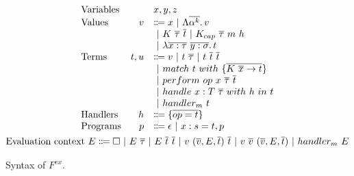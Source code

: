 \documentclass[acmsmall]{acmart}
\newcommand{\vor}{~|~}
\newcommand{\ap}{~}
\begin{document}
\begin{figure}
    \centering
    \begin{gather*}
        \begin{array}{lrll}
            \text{Variables} & & x, y, z \\
            \text{Values} &v &\Coloneqq x \vor \Lambda \overline{\alpha^k} \ldotp v \\
            &&\vor K\ap \overline{\tau} \ap \overline{t} \vor K_{cap}\ap\overline{\tau}\ap m\ap h \\
            &&\vor \lambda \overline{x : \tau}~\overline{y : \sigma}\ldotp t
            \\
            \text{Terms} &t, u &\Coloneqq v \vor t\ap\overline{\tau} \vor t \ap \overline{t} \ap \overline{t} \\
            &&\vor match ~ t ~ with ~\{\overline{K \ap \overline{x} \to t}\} \\
            &&\vor perform ~ op \ap x \ap \overline{\tau} \ap \overline{t} \\
            &&\vor handle ~ x : T \ap \overline{\tau} ~with ~h~in ~t \\
            &&\vor handler_m ~ t
            \\
            \text{Handlers} &h &\Coloneqq \{ \overline{op = t} \}
            \\
            \text{Programs} &p &\Coloneqq \epsilon \vor x : s = t, p
        \end{array}\\
        \begin{aligned}
            \text{Evaluation context } E \Coloneqq \square \vor E \ap \overline{\tau} \vor E \ap \overline{t}\ap \overline{t} \vor v \ap (\overline{v}, E, \overline{t}) \ap \overline{t} \vor v \ap \overline{v} \ap (\overline{v}, E, \overline{t}) \vor handler_m ~ E
        \end{aligned}\\
    \end{gather*}
    \caption{Syntax of $F^{ex}$.}
    \label{fig:kek}
\end{figure}
\end{document}
